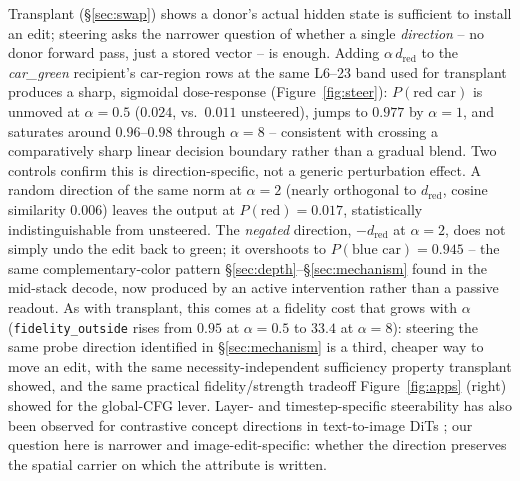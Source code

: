 \documentclass[10pt,twocolumn,letterpaper]{article}
\begin{document}
Transplant (\S\ref{sec:swap}) shows a donor's actual hidden state is
sufficient to install an edit; steering asks the narrower question of
whether a single \emph{direction} -- no donor forward pass, just a
stored vector -- is enough. Adding $\alpha\,d_{\text{red}}$ to the
\emph{car\_green} recipient's car-region rows at the same L6--23 band
used for transplant produces a sharp, sigmoidal dose-response
(Figure~\ref{fig:steer}): $P(\text{red car})$ is unmoved at
$\alpha{=}0.5$ ($0.024$, vs.\ $0.011$ unsteered), jumps to $0.977$ by
$\alpha{=}1$, and saturates around $0.96$--$0.98$ through
$\alpha{=}8$ -- consistent with crossing a comparatively sharp linear
decision boundary rather than a gradual blend. Two controls confirm
this is direction-specific, not a generic perturbation effect. A random
direction of the same norm at $\alpha{=}2$ (nearly orthogonal to
$d_{\text{red}}$, cosine similarity $0.006$) leaves the output at
$P(\text{red})=0.017$, statistically indistinguishable from unsteered.
The \emph{negated} direction, $-d_{\text{red}}$ at $\alpha{=}2$, does not
simply undo the edit back to green; it overshoots to
$P(\text{blue car})=0.945$ -- the same complementary-color pattern
\S\ref{sec:depth}--\S\ref{sec:mechanism} found in the mid-stack decode,
now produced by an active intervention rather than a passive readout.
As with transplant, this comes at a fidelity cost that grows with
$\alpha$ (\texttt{fidelity\_outside} rises from $0.95$ at
$\alpha{=}0.5$ to $33.4$ at $\alpha{=}8$): steering the same probe
direction identified in \S\ref{sec:mechanism} is a third, cheaper way
to move an edit, with the same necessity-independent sufficiency
property transplant showed, and the same practical fidelity/strength
tradeoff Figure~\ref{fig:apps} (right) showed for the global-CFG lever.
Layer- and timestep-specific steerability has also been observed for
contrastive concept directions in text-to-image DiTs
\citep{ohib2026conceptspaces}; our question here is narrower and
image-edit-specific: whether the direction preserves the spatial carrier on
which the attribute is written.
\end{document}
